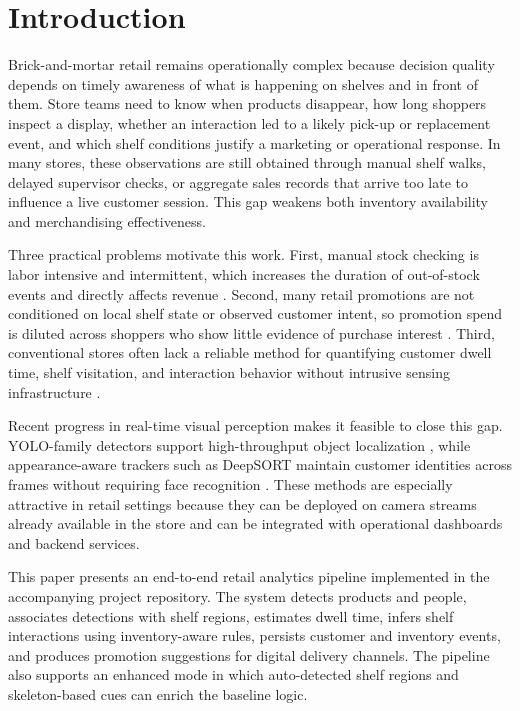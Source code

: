 \documentclass[conference]{IEEEtran}
\begin{document}
\section{Introduction}

Brick-and-mortar retail remains operationally complex because decision quality depends on timely awareness of what is happening on shelves and in front of them. Store teams need to know when products disappear, how long shoppers inspect a display, whether an interaction led to a likely pick-up or replacement event, and which shelf conditions justify a marketing or operational response. In many stores, these observations are still obtained through manual shelf walks, delayed supervisor checks, or aggregate sales records that arrive too late to influence a live customer session. This gap weakens both inventory availability and merchandising effectiveness.

Three practical problems motivate this work. First, manual stock checking is labor intensive and intermittent, which increases the duration of out-of-stock events and directly affects revenue \cite{gruen2002retail}. Second, many retail promotions are not conditioned on local shelf state or observed customer intent, so promotion spend is diluted across shoppers who show little evidence of purchase interest \cite{verhoef2016digital}. Third, conventional stores often lack a reliable method for quantifying customer dwell time, shelf visitation, and interaction behavior without intrusive sensing infrastructure \cite{shankar2021omnichannel}.

Recent progress in real-time visual perception makes it feasible to close this gap. YOLO-family detectors support high-throughput object localization \cite{redmon2016yolo,jocher2023yolov8}, while appearance-aware trackers such as DeepSORT maintain customer identities across frames without requiring face recognition \cite{wojke2017simple}. These methods are especially attractive in retail settings because they can be deployed on camera streams already available in the store and can be integrated with operational dashboards and backend services.

This paper presents an end-to-end retail analytics pipeline implemented in the accompanying project repository. The system detects products and people, associates detections with shelf regions, estimates dwell time, infers shelf interactions using inventory-aware rules, persists customer and inventory events, and produces promotion suggestions for digital delivery channels. The pipeline also supports an enhanced mode in which auto-detected shelf regions and skeleton-based cues can enrich the baseline logic.
\end{document}
